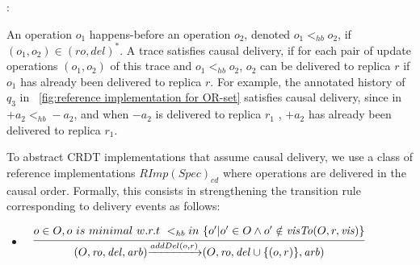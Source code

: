 :

An operation $o_1$ happens-before \cite{Lamport:1978} an operation $o_2$, denoted $o_1 <_{\mathit{hb}} o_2$, if $(o_1,o_2) \in (\mathit{ro},\mathit{del})^*$. A trace satisfies causal delivery, if for each pair of update operations $(o_1,o_2)$ of this trace and $o_1 <_{\mathit{hb}} o_2$, $o_2$ can be delivered to replica $r$ if $o_1$ has already been delivered to replica $r$. {\color {red}For example, the annotated history of $q_3$ in \figurename~\ref{fig:reference implementation for OR-set} satisfies causal delivery, since in $+a_2 <_{\mathit{hb}} -a_2$, and when $-a_2$ is delivered to replica $r_1$ , $+a_2$ has already been delivered to replica $r_1$.}

To abstract CRDT implementations that assume causal delivery, we use a class of reference implementations $\mathit{RImp}(\mathit{Spec})_{\mathit{cd}}$ where operations are delivered in the causal order. Formally, this consists in strengthening the transition rule corresponding to delivery events as follows:


\begin {itemize}
\setlength{\itemsep}{0.5pt}
\item[-] $\begin{array}{l c} \bigfrac{o \in O, o \ is \ minimal \ w.r.t \ <_{\mathit{hb}} in \ \{ o' \vert o' \in O \wedge o' \notin \mathit{visTo}(O,r,\mathit{vis}) \}} {(O,\mathit{ro},\mathit{del},\mathit{arb}) {\xrightarrow{addDel(o,r)}} (O,\mathit{ro},\mathit{del} \cup \{ (o,r) \},\mathit{arb})} \end{array}$
\end{itemize}






